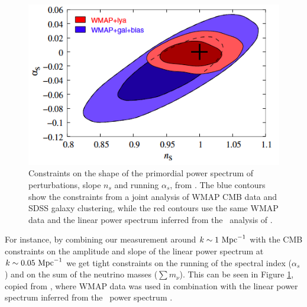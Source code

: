 \begin{figure}[h]
 \begin{center}
  \includegraphics[scale=0.6]{Figures/Seljak2005_contour2D}
 \end{center}
 \caption{Constraints on the shape of the primordial power spectrum of
  perturbations, slope $n_s$ and running $\alpha_s$, from \cite{Seljak2005}.
  The blue contours show the constraints from a joint analysis of WMAP CMB
  data and SDSS galaxy clustering, while the red contours use the same WMAP
  data and the linear power spectrum inferred from the \lya\ analysis of
  \cite{McDonald2005a}.
 }
 \label{fig:Seljak2005}
\end{figure}

For instance, by combining our measurement around $k \sim 1 \ \text{Mpc}^{-1}$ with the CMB
constraints on the amplitude and slope of the linear power spectrum at
$k \sim 0.05 \ \text{Mpc}^{-1}$ we get tight constraints on the running of the spectral
index ($\alpha_s$) and on the sum of the neutrino masses ($\sum m_\nu$).
This can be seen in Figure \ref{fig:Seljak2005}, copied from \cite{Seljak2005},
where WMAP data was used in combination with the linear power spectrum
inferred from the \lya\ power spectrum \cite{McDonald2005a}.

